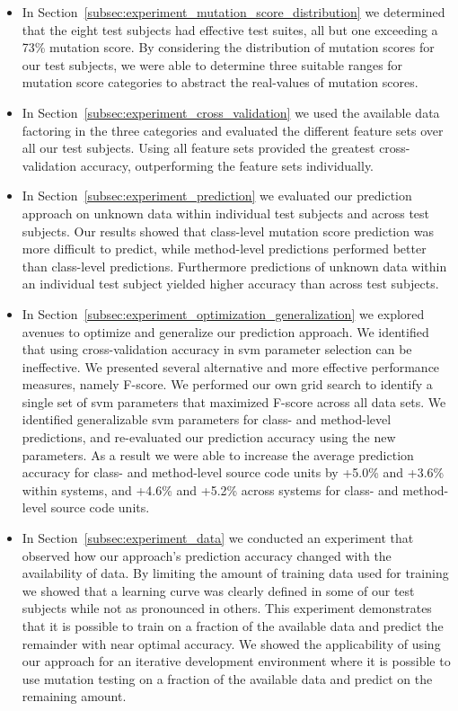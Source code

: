 \begin{itemize}
  \item In Section~\ref{subsec:experiment_mutation_score_distribution} we determined that the eight test subjects had effective test suites, all but one exceeding a 73\% mutation score. By considering the distribution of mutation scores for our test subjects, we were able to determine three suitable ranges for mutation score categories to abstract the real-values of mutation scores.
  \item In Section~\ref{subsec:experiment_cross_validation} we used the available data factoring in the three categories and evaluated the different feature sets over all our test subjects. Using all feature sets provided the greatest cross-validation accuracy, outperforming the feature sets individually.
  \item In Section~\ref{subsec:experiment_prediction} we evaluated our prediction approach on unknown data within individual test subjects and across test subjects. Our results showed that class-level mutation score prediction was more difficult to predict, while method-level predictions performed better than class-level predictions. Furthermore predictions of unknown data within an individual test subject yielded higher accuracy than across test subjects.
  \item In Section~\ref{subsec:experiment_optimization_generalization} we explored avenues to optimize and generalize our prediction approach. We identified that using cross-validation accuracy in \gls{svm} parameter selection can be ineffective. We presented several alternative and more effective performance measures, namely F-score. We performed our own grid search to identify a single set of \gls{svm} parameters that maximized F-score across all data sets. We identified generalizable \gls{svm} parameters for class- and method-level predictions, and re-evaluated our prediction accuracy using the new parameters. As a result we were able to increase the average prediction accuracy for class- and method-level source code units by +5.0\% and +3.6\% within systems, and +4.6\% and +5.2\% across systems for class- and method-level source code units.
  \item In Section~\ref{subsec:experiment_data} we conducted an experiment that observed how our approach's prediction accuracy changed with the availability of data. By limiting the amount of training data used for training we showed that a learning curve was clearly defined in some of our test subjects while not as pronounced in others. This experiment demonstrates that it is possible to train on a fraction of the available data and predict the remainder with near optimal accuracy. We showed the applicability of using our approach for an iterative development environment where it is possible to use mutation testing on a fraction of the available data and predict on the remaining amount.
\end{itemize}


